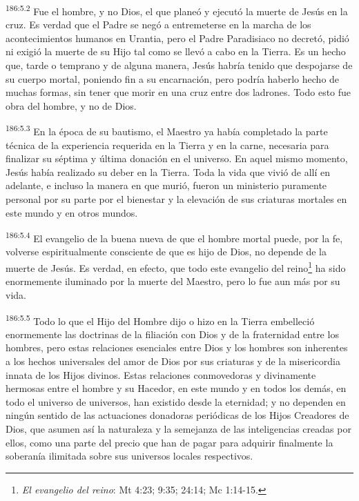 \par
\textsuperscript{186:5.2} Fue el hombre, y no Dios, el que planeó y ejecutó la muerte de Jesús en la cruz. Es verdad que el Padre se negó a entremeterse en la marcha de los acontecimientos humanos en Urantia, pero el Padre Paradisiaco no decretó, pidió ni exigió la muerte de su Hijo tal como se llevó a cabo en la Tierra. Es un hecho que, tarde o temprano y de alguna manera, Jesús habría tenido que despojarse de su cuerpo mortal, poniendo fin a su encarnación, pero podría haberlo hecho de muchas formas, sin tener que morir en una cruz entre dos ladrones. Todo esto fue obra del hombre, y no de Dios.

\par
\textsuperscript{186:5.3} En la época de su bautismo, el Maestro ya había completado la parte técnica de la experiencia requerida en la Tierra y en la carne, necesaria para finalizar su séptima y última donación en el universo. En aquel mismo momento, Jesús había realizado su deber en la Tierra. Toda la vida que vivió de allí en adelante, e incluso la manera en que murió, fueron un ministerio puramente personal por su parte por el bienestar y la elevación de sus criaturas mortales en este mundo y en otros mundos.

\par
\textsuperscript{186:5.4} El evangelio de la buena nueva de que el hombre mortal puede, por la fe, volverse espiritualmente consciente de que es hijo de Dios, no depende de la muerte de Jesús. Es verdad, en efecto, que todo este evangelio del reino\footnote{\textit{El evangelio del reino}: Mt 4:23; 9:35; 24:14; Mc 1:14-15.} ha sido enormemente iluminado por la muerte del Maestro, pero lo fue aun más por su vida.

\par
\textsuperscript{186:5.5} Todo lo que el Hijo del Hombre dijo o hizo en la Tierra embelleció enormemente las doctrinas de la filiación con Dios y de la fraternidad entre los hombres, pero estas relaciones esenciales entre Dios y los hombres son inherentes a los hechos universales del amor de Dios por sus criaturas y de la misericordia innata de los Hijos divinos. Estas relaciones conmovedoras y divinamente hermosas entre el hombre y su Hacedor, en este mundo y en todos los demás, en todo el universo de universos, han existido desde la eternidad; y no dependen en ningún sentido de las actuaciones donadoras periódicas de los Hijos Creadores de Dios, que asumen así la naturaleza y la semejanza de las inteligencias creadas por ellos, como una parte del precio que han de pagar para adquirir finalmente la soberanía ilimitada sobre sus universos locales respectivos.

